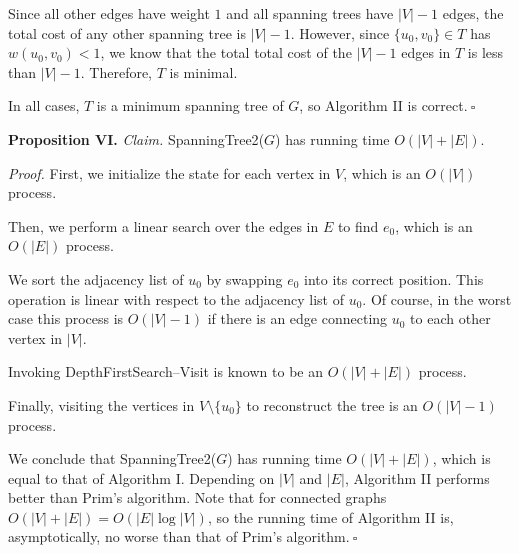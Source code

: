 \begin{enumerate}
\begin{solution}
\begin{itemize}
    Since all other edges have weight $1$ and all spanning trees have $|V|-1$ edges, the total cost of any other spanning tree is $|V|-1$. However, since $\{u_0,v_0\}\in T$ has $w(u_0,v_0)<1$, we know that the total total cost of the $|V|-1$ edges in $T$ is less than $|V|-1$. Therefore, $T$ is minimal.
\end{itemize}
In all cases, $T$ is a minimum spanning tree of $G$, so Algorithm II is correct.$~\square$

\textbf{Proposition VI. }\textit{Claim. }{\sc SpanningTree2}($G$) has running time $O(|V|+|E|)$.

\textit{Proof. }First, we initialize the state for each vertex in $V$, which is an $O(|V|)$ process.

Then, we perform a linear search over the edges in $E$ to find $e_0$, which is an $O(|E|)$ process.

We sort the adjacency list of $u_0$ by swapping $e_0$ into its correct position. This operation is linear with respect to the adjacency list of $u_0$. Of course, in the worst case this process is $O(|V|-1)$ if there is an edge connecting $u_0$ to each other vertex in $|V|$.

Invoking {\sc DepthFirstSearch--Visit} is known to be an $O(|V|+|E|)$ process.

Finally, visiting the vertices in $V\setminus\{u_0\}$ to reconstruct the tree is an $O(|V|-1)$ process.

We conclude that {\sc SpanningTree2}($G$) has running time $O(|V|+|E|)$, which is equal to that of Algorithm I. Depending on $|V|$ and $|E|$, Algorithm II performs better than Prim's algorithm. Note that for connected graphs $O(|V|+|E|)=O(|E|\log|V|)$, so the running time of Algorithm II is, asymptotically, no worse than that of Prim's algorithm.$~\square$
\end{solution}
\end{enumerate}